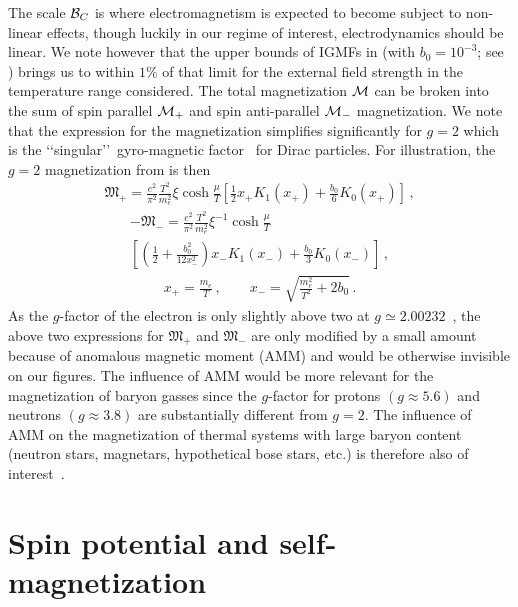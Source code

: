 The scale ${\cal B}_{C}$ is where electromagnetism is expected to become subject to non-linear effects, though luckily in our regime of interest, electrodynamics should be linear. We note however that the upper bounds of IGMFs in  (with $b_{0}=10^{-3}$; see ) brings us to within $1\%$ of that limit for the external field strength in the temperature range considered. The total magnetization ${\cal M}$ can be broken into the sum of spin parallel ${\cal M}_{+}$ and spin anti-parallel ${\cal M}_{-}$ magnetization. We note that the expression for the magnetization simplifies significantly for $g=2$ which is the \lq\lq singular\rq\rq\ gyro-magnetic factor~\cite{Evans:2022fsu,Rafelski:2022bsv} for Dirac particles. For illustration, the $g=2$ magnetization from  is then
\begin{align}
 \label{g2magplus}
 {\mathfrak M}_{+}=\frac{e^{2}}{\pi^{2}}\frac{T^{2}}{m_{e}^{2}}\xi\cosh{\frac{\mu}{T}}\left[\frac{1}{2}x_{+}K_{1}(x_{+})+\frac{b_{0}}{6}K_{0}(x_{+})\right]\,,
\end{align}
\begin{multline}  
 \label{g2magminus}
 -{\mathfrak M}_{-}=\frac{e^{2}}{\pi^{2}}\frac{T^{2}}{m_{e}^{2}}\xi^{-1}\cosh{\frac{\mu}{T}}\\
 \left[\left(\frac{1}{2}+\frac{b_{0}^{2}}{12x_{-}^{2}}\right)x_{-}K_{1}(x_{-})+\frac{b_{0}}{3}K_{0}(x_{-})\right]\,,
\end{multline}
\begin{align}
 x_{+}=\frac{m_{e}}{T}\,,\qquad
 x_{-}=\sqrt{\frac{m_{e}^{2}}{T^{2}}+2b_{0}}\,.
\end{align}
As the $g$-factor of the electron is only slightly above two at $g\simeq2.00232$~\cite{Tiesinga:2021myr}, the above two expressions for ${\mathfrak M}_{+}$ and ${\mathfrak M}_{-}$ are only modified by a small amount because of anomalous magnetic moment (AMM) and would be otherwise invisible on our figures. The influence of AMM would be more relevant for the magnetization of baryon gasses since the $g$-factor for protons $(g\approx5.6)$ and neutrons $(g\approx3.8)$ are substantially different from $g=2$. The influence of AMM on the magnetization of thermal systems with large baryon content (neutron stars, magnetars, hypothetical bose stars, etc.) is therefore also of interest~\cite{Ferrer:2019xlr,Ferrer:2023pgq}.


\section{Spin potential and self-magnetization}
\label{sec:self}




